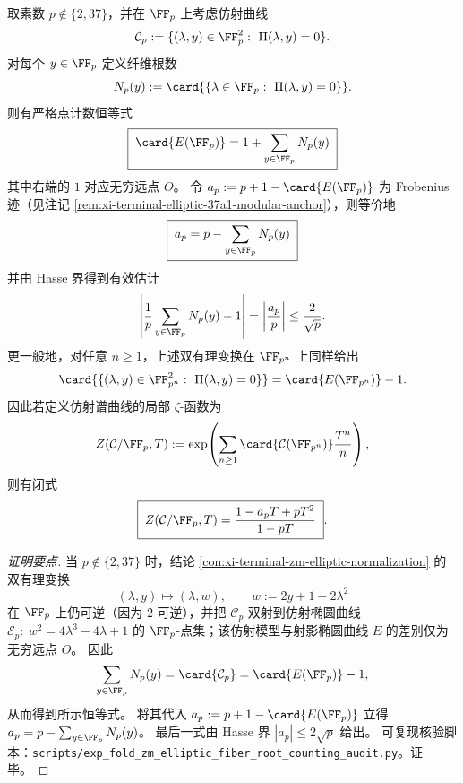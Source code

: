 \begin{conclusion}\label{con:xi-terminal-zm-fiber-root-counting-hecke}
取素数 \(p\notin\{2,37\}\)，并在 \(\FF_p\) 上考虑仿射曲线
\[
\mathcal C_p:=\{(\lambda,y)\in\FF_p^2:\ \Pi(\lambda,y)=0\}.
\]
对每个 \(y\in\FF_p\) 定义纤维根数
\[
N_p(y):=\card{\{\lambda\in\FF_p:\ \Pi(\lambda,y)=0\}}.
\]
则有严格点计数恒等式
\[
\boxed{\;
\card{E(\FF_p)}=1+\sum_{y\in\FF_p}N_p(y)\;}
\]
其中右端的 \(1\) 对应无穷远点 \(O\)。
令 \(a_p:=p+1-\card{E(\FF_p)}\) 为 Frobenius 迹（见注记 \ref{rem:xi-terminal-elliptic-37a1-modular-anchor}），则等价地
\[
\boxed{\;
a_p=p-\sum_{y\in\FF_p}N_p(y)\;}
\]
并由 Hasse 界得到有效估计
\[
\left|\frac{1}{p}\sum_{y\in\FF_p}N_p(y)-1\right|
=\left|\frac{a_p}{p}\right|
\le \frac{2}{\sqrt p}.
\]
更一般地，对任意 \(n\ge 1\)，上述双有理变换在 \(\FF_{p^n}\) 上同样给出
\[
\card{\{(\lambda,y)\in\FF_{p^n}^2:\ \Pi(\lambda,y)=0\}}=\card{E(\FF_{p^n})}-1.
\]
因此若定义仿射谱曲线的局部 \(\zeta\)-函数为
\[
Z(\mathcal C/\FF_p,T):=\exp\!\left(\sum_{n\ge 1}\card{\mathcal C(\FF_{p^n})}\frac{T^n}{n}\right),
\]
则有闭式
\[
\boxed{\; Z(\mathcal C/\FF_p,T)=\frac{1-a_pT+pT^2}{1-pT}\; }.
\]
\end{conclusion}
\begin{proof}[证明要点]
当 \(p\notin\{2,37\}\) 时，结论 \ref{con:xi-terminal-zm-elliptic-normalization} 的双有理变换
\[
(\lambda,y)\longmapsto (\lambda,w),\qquad w:=2y+1-2\lambda^{2}
\]
在 \(\FF_p\) 上仍可逆（因为 \(2\) 可逆），并把 \(\mathcal C_p\) 双射到仿射椭圆曲线
\(
\mathcal E_p:\ w^2=4\lambda^3-4\lambda+1
\)
的 \(\FF_p\)-点集；该仿射模型与射影椭圆曲线 \(E\) 的差别仅为无穷远点 \(O\)。
因此
\[
\sum_{y\in\FF_p}N_p(y)=\card{\mathcal C_p}=\card{E(\FF_p)}-1,
\]
从而得到所示恒等式。
将其代入 \(a_p:=p+1-\card{E(\FF_p)}\) 立得 \(a_p=p-\sum_{y\in\FF_p} N_p(y)\)。
最后一式由 Hasse 界 \(|a_p|\le 2\sqrt p\) 给出。
可复现核验脚本：\texttt{scripts/exp\_fold\_zm\_elliptic\_fiber\_root\_counting\_audit.py}。证毕。
\end{proof}



